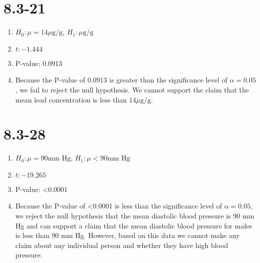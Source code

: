 \documentclass[12pt,fleqn]{article}
\newcommand{\chapter}{8.3}
\newcommand{\problem}[1]{\vspace{5ex}\section*{\chapter-#1}}
\begin{document}
\problem{21}
\begin{enumerate}[label=\alph*.]
\item $H_0: \mu = 14 \mu \text{g} / \text{g}$, $H_1: \mu \text{g} / \text{g}$
\item $t: -1.444$
\item P-value: 0.0913
\item Because the P-value of 0.0913 is greater than the significance level of $\alpha = 0.05$, we fail to reject the null hypothesis. We cannot support the claim that the mean lead concentration is less than $14 \mu \text{g} / \text{g}$.
\end{enumerate}


\problem{28}
\begin{enumerate}[label=\alph*.]
\item $H_0: \mu = 90 \text{mm~Hg}$, $H_1: \mu < 90 \text{mm~Hg}$
\item $t: -19.265$
\item P-value: <0.0001
\item Because the P-value of <0.0001 is less than the significance level of $\alpha = 0.05$, we reject the null hypothesis that the mean diastolic blood pressure is 90 mm Hg and can support a claim that the mean diastolic blood pressure for males is less than 90 mm Hg. However, based on this data we cannot make any claim about any individual person and whether they have high blood pressure.
\end{enumerate}
\end{document}
